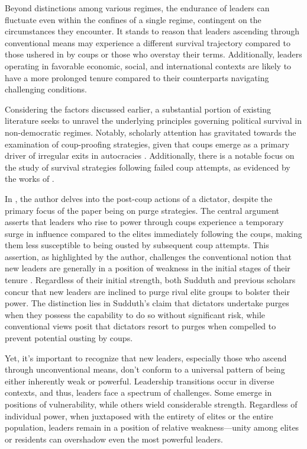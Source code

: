 \documentclass[
  12pt,
  a4paper,
  12pt]{article}
\begin{document}
Beyond distinctions among various regimes, the endurance of leaders can
fluctuate even within the confines of a single regime, contingent on the
circumstances they encounter. It stands to reason that leaders ascending
through conventional means may experience a different survival
trajectory compared to those ushered in by coups or those who overstay
their terms. Additionally, leaders operating in favorable economic,
social, and international contexts are likely to have a more prolonged
tenure compared to their counterparts navigating challenging conditions.

Considering the factors discussed earlier, a substantial portion of
existing literature seeks to unravel the underlying principles governing
political survival in non-democratic regimes. Notably, scholarly
attention has gravitated towards the examination of coup-proofing
strategies, given that coups emerge as a primary driver of irregular
exits in autocracies
\citep{quinlivan1999, powell2014, sudduth2017, tang2021}. Additionally,
there is a notable focus on the study of survival strategies following
failed coup attempts, as evidenced by the works of
\citep{kebschull1994, easton2018, oztig2020}.

In \citet{sudduth2017a}, the author delves into the post-coup actions of
a dictator, despite the primary focus of the paper being on purge
strategies. The central argument asserts that leaders who rise to power
through coups experience a temporary surge in influence compared to the
elites immediately following the coups, making them less susceptible to
being ousted by subsequent coup attempts. This assertion, as highlighted
by the author, challenges the conventional notion that new leaders are
generally in a position of weakness in the initial stages of their
tenure \citep{roessler2011}. Regardless of their initial strength, both
Sudduth and previous scholars concur that new leaders are inclined to
purge rival elite groups to bolster their power. The distinction lies in
Sudduth's claim that dictators undertake purges when they possess the
capability to do so without significant risk, while conventional views
posit that dictators resort to purges when compelled to prevent
potential ousting by coups.

Yet, it's important to recognize that new leaders, especially those who
ascend through unconventional means, don't conform to a universal
pattern of being either inherently weak or powerful. Leadership
transitions occur in diverse contexts, and thus, leaders face a spectrum
of challenges. Some emerge in positions of vulnerability, while others
wield considerable strength. Regardless of individual power, when
juxtaposed with the entirety of elites or the entire population, leaders
remain in a position of relative weakness---unity among elites or
residents can overshadow even the most powerful leaders.
\end{document}
